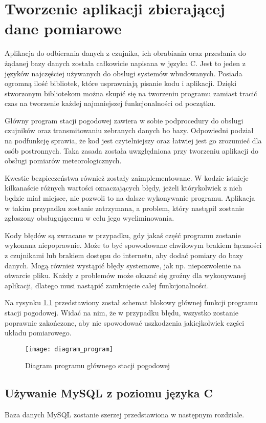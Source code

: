 \chapter{Tworzenie aplikacji zbierającej dane pomiarowe}

Aplikacja do odbierania danych z czujnika, ich obrabiania oraz przesłania do żądanej bazy danych została całkowicie napisana w języku C. Jest to jeden z języków najczęściej używanych do obsługi systemów wbudowanych. Posiada ogromną ilość bibliotek, które usprawniają pisanie kodu i aplikacji. Dzięki stworzonym bibliotekom można skupić się na tworzeniu programu zamiast tracić czas na tworzenie każdej najmniejszej funkcjonalności od początku.

Główny program stacji pogodowej zawiera w sobie podprocedury do obsługi czujników oraz transmitowaniu zebranych danych bo bazy. Odpowiedni podział na podfunkcję sprawia, że kod jest czytelniejszy oraz łatwiej jest go zrozumieć dla osób postronnych. Taka zasada została uwzględniona przy tworzeniu aplikacji do obsługi pomiarów meteorologicznych.

Kwestie bezpieczeństwa również zostały zaimplementowane. W kodzie istnieje kilkanaście różnych wartości oznaczających błędy, jeżeli którykolwiek z nich będzie miał miejsce, nie pozwoli to na dalsze wykonywanie programu. Aplikacja w takim przypadku zostanie zatrzymana, a problem, który nastąpił zostanie zgłoszony obsługującemu w celu jego wyeliminowania.

Kody błędów są zwracane w przypadku, gdy jakaś część programu zostanie wykonana niepoprawnie. Może to być spowodowane chwilowym brakiem łączności z czujnikami lub brakiem dostępu do internetu, aby dodać pomiary do bazy danych. Mogą również wystąpić błędy systemowe, jak np. niepozwolenie na otwarcie pliku. Każdy z problemów może okazać się groźny dla wykonywanej aplikacji, dlatego musi nastąpić zamknięcie całej funkcjonalności.

Na rysynku \ref{fig:diagram_program} przedstawiony został schemat blokowy głównej funkcji programu stacji pogodowej. Widać na nim, że w przypadku błędu, wszystko zostanie poprawnie zakończone, aby nie spowodować uszkodzenia jakiejkolwiek części układu pomiarowego.

\begin{figure}[h]
\centering
\texttt{[image: diagram\_program]}
\caption{Diagram programu głównego stacji pogodowej}
\label{fig:diagram_program}
\end{figure}

\section*{Używanie MySQL z poziomu języka C}
Baza danych MySQL zostanie szerzej przedstawiona w następnym rozdziale.

